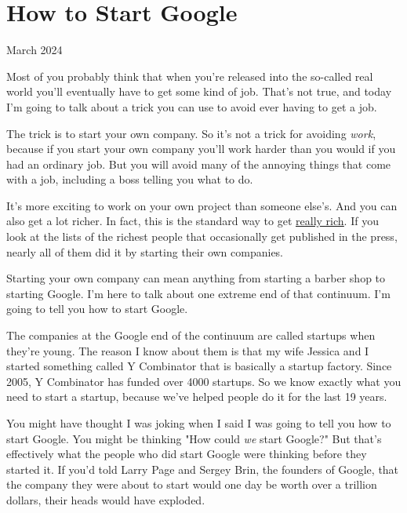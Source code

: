 \chapter{How to Start Google}


            
              
                

March 2024



Most of you probably think that when you're
                  released into the so-called real world you'll eventually have
                  to get some kind of job. That's not true, and today I'm going
                  to talk about a trick you can use to avoid ever having to get
                  a job.

The trick is to start your own company. So
                  it's not a trick for avoiding \emph{work}, because if you
                  start your own company you'll work harder than you would if
                  you had an ordinary job. But you will avoid many of the
                  annoying things that come with a job, including a boss telling
                  you what to do.

It's more exciting to work on your
                  own project than someone else's. And you can also get a lot
                  richer. In fact, this is the standard way to get
                  \href{http://www.paulgraham.com/richnow.html}{\underline{really rich}}. If you look at the lists of the richest people that
                  occasionally get published in the press, nearly all of them
                  did it by starting their own companies.

Starting
                  your own company can mean anything from starting a barber shop
                  to starting Google. I'm here to talk about one extreme end of
                  that continuum. I'm going to tell you how to start Google.

The
                  companies at the Google end of the continuum are called
                  startups when they're young. The reason I know about them is
                  that my wife Jessica and I started something called Y
                  Combinator that is basically a startup factory. Since 2005, Y
                  Combinator has funded over 4000 startups. So we know exactly
                  what you need to start a startup, because we've helped people
                  do it for the last 19 years.

You might have thought
                  I was joking when I said I was going to tell you how to start
                  Google. You might be thinking "How could \emph{we} start
                  Google?" But that's effectively what the people who did start
                  Google were thinking before they started it. If you'd told
                  Larry Page and Sergey Brin, the founders of Google, that the
                  company they were about to start would one day be worth over a
                  trillion dollars, their heads would have exploded.

